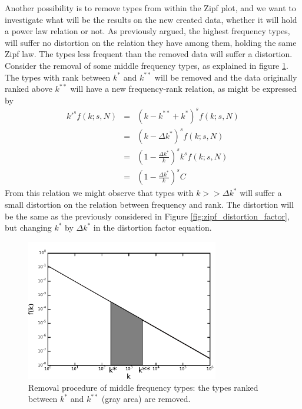 Another possibility is to remove types from within the Zipf plot, and we want to investigate 
what will be the results on the new created data, whether it will hold a power law relation or not.
As previously argued, the highest frequency types, will suffer no distortion on the relation they
have among them, holding the same Zipf law. The types less frequent than the removed data will suffer
a distortion. Consider the removal of some middle frequency types, as explained in figure
\ref{fig:remove_kast_kastast}. The types with rank between $k^\ast$ and $k^{\ast\ast}$ will be removed
and the data originally ranked above $k^{\ast\ast}$ will have a new frequency-rank relation, as might
be expressed by 
\begin{eqnarray}
k'^s f(k; s, N) &=& (k-k^{\ast\ast}+k^\ast)^s f(k; s, N) \nonumber \\
                &=& (k-\Delta k^\ast)^s f(k; s, N) \nonumber \\
                &=& \left(1 - \frac{\Delta k^\ast}{k} \right)^s k^s f(k; s, N) \nonumber \\
                &=& \left(1 - \frac{\Delta k^\ast}{k} \right)^s C
\end{eqnarray}
From this relation we might observe that types with $k >> \Delta k^\ast$ will suffer a small distortion 
on the relation between frequency and rank. The distortion will be the same as the previously considered
in Figure \ref{fig:zipf_distortion_factor}, but changing $k^\ast$ by $\Delta k^\ast$ in the distortion factor 
equation. 


\begin{figure}[htbp]
\centering
\includegraphics[width=0.75\textwidth]{images/remove_kast_kastast.pdf}
\caption{Removal procedure of middle frequency types: the types ranked between $k^\ast$ and $k^{\ast\ast}$ (gray area) are removed.}
\label{fig:remove_kast_kastast}
\end{figure}



